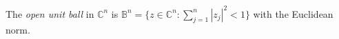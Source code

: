 
The \emph{open unit ball} in $\mathbb C^n$ is $\mathbb B^n=\{z\in\mathbb C^n:\sum_{j=1}^n|z_j|^2<1\}$ with the Euclidean norm.
